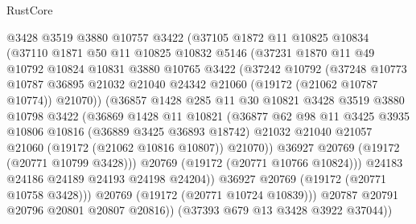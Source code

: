 \begin{lexlean}{RustCore}
\begin{coremodule}
              @3428
              @3519
              @3880
              @10757
              @3422
              (@37105
                @1872
                @11
                @10825
                @10834
                (@37110
                  @1871
                  @50
                  @11
                  @10825
                  @10832
                  @5146
                  (@37231
                    @1870
                    @11
                    @49
                    @10792
                    @10824
                    @10831
                    @3880
                    @10765
                    @3422
                    (@37242
                      @10792
                      (@37248
                        @10773
                        @10787
                        @36895
                        @21032
                        @21040
                        @24342
                        @21060
                        (@19172 (@21062 @10787 @10774))
                        @21070))
                    (@36857
                      @1428
                      @285
                      @11
                      @30
                      @10821
                      @3428
                      @3519
                      @3880
                      @10798
                      @3422
                      (@36869
                        @1428
                        @11
                        @10821
                        (@36877
                          @62
                          @98
                          @11
                          @3425
                          @3935
                          @10806
                          @10816
                          (@36889 @3425 @36893 @18742)
                          @21032
                          @21040
                          @21057
                          @21060
                          (@19172 (@21062 @10816 @10807))
                          @21070))
                      @36927
                      @20769
                      (@19172 (@20771 @10799 @3428)))
                    @20769
                    (@19172 (@20771 @10766 @10824)))
                  @24183
                  @24186
                  @24189
                  @24193
                  @24198
                  @24204))
              @36927
              @20769
              (@19172 (@20771 @10758 @3428)))
            @20769
            (@19172 (@20771 @10724 @10839)))
          @20787
          @20791
          @20796
          @20801
          @20807
          @20816))
      (@37393 @679 @13 @3428 @3922 @37044))

\end{coremodule}
\end{lexlean}
